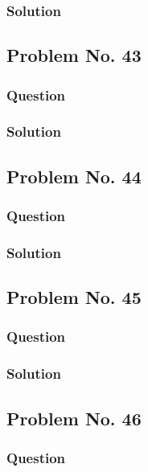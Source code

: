 \documentclass[journal,12pt,twocolumn]{IEEEtran}
\begin{document}
\subsubsection{Solution}


\subsection{Problem No. 43}
\subsubsection{Question}

\subsubsection{Solution}


\subsection{Problem No. 44}
\subsubsection{Question}

\subsubsection{Solution}


\subsection{Problem No. 45}
\subsubsection{Question}

\subsubsection{Solution}


\subsection{Problem No. 46}
\subsubsection{Question}

\end{document}
